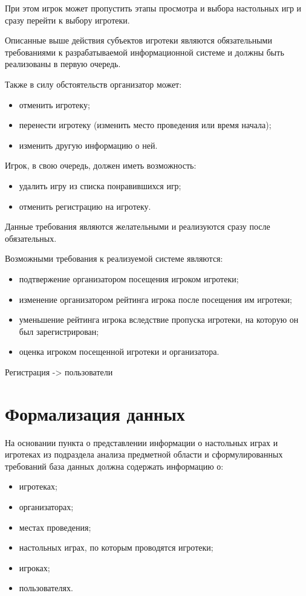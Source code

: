 При этом игрок может пропустить этапы просмотра и выбора настольных игр и
сразу перейти к выбору игротеки.

Описанные выше действия субъектов игротеки являются обязательными требованиями
к разрабатываемой информационной системе и должны быть реализованы в первую
очередь.

Также в силу обстоятельств организатор может:
\begin{itemize}
    \item отменить игротеку;
    \item перенести игротеку (изменить место проведения или время начала);
    \item изменить другую информацию о ней.
\end{itemize}

Игрок, в свою очередь, должен иметь возможность:
\begin{itemize}
    \item удалить игру из списка понравившихся игр;
    \item отменить регистрацию на игротеку.
\end{itemize}

Данные требования являются желательными и реализуются сразу после обязательных.
 
Возможными требования к реализуемой системе являются:
\begin{itemize}
    \item подтвержение организатором посещения игроком игротеки;
    \item изменение организатором рейтинга игрока после посещения им игротеки;
    \item уменьшение рейтинга игрока вследствие пропуска игротеки, на которую он
        был зарегистрирован;
    \item оценка игроком посещенной игротеки и организатора.
\end{itemize}

Регистрация -> пользователи


\section{Формализация данных}

На основании пункта о представлении информации о настольных играх и игротеках из
подраздела анализа предметной области и сформулированных требований база данных
должна содержать информацию о:

\begin{itemize}
    \item игротеках;
    \item организаторах;
    \item местах проведения;
    \item настольных играх, по которым проводятся игротеки;
    \item игроках;
    \item пользователях.
\end{itemize}


